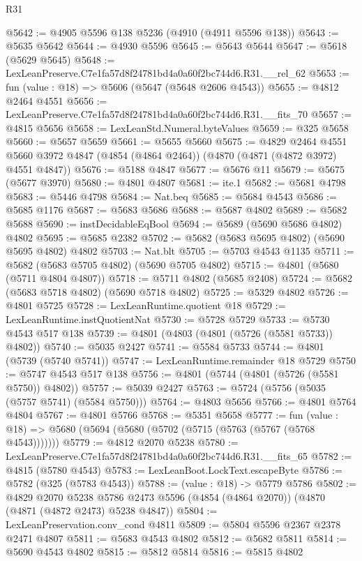 \begin{lexlean}{R31}
\begin{coremodule}
@5642 := @4905 @5596 @138 @5236 (@4910 (@4911 @5596 @138))
@5643 := @5635 @5642
@5644 := @4930 @5596
@5645 := @5643 @5644
@5647 := @5618 (@5629 @5645)
@5648 := LexLeanPreserve.C7e1fa57d8f24781bd4a0a60f2bc744d6.R31.__rel_62
@5653 := fun (value : @18) => @5606 (@5647 (@5648 @2606 @4543))
@5655 := @4812 @2464 @4551
@5656 := LexLeanPreserve.C7e1fa57d8f24781bd4a0a60f2bc744d6.R31.__fits_70
@5657 := @4815 @5656
@5658 := LexLeanStd.Numeral.byteValues
@5659 := @325 @5658
@5660 := @5657 @5659
@5661 := @5655 @5660
@5675 := @4829
    @2464
    @4551
    @5660
    @3972
    @4847
    (@4854 (@4864 @2464))
    (@4870 (@4871 (@4872 @3972) @4551 @4847))
@5676 := @5188 @4847
@5677 := @5676 @11
@5679 := @5675 (@5677 @3970)
@5680 := @4801 @4807
@5681 := ite.{1}
@5682 := @5681 @4798
@5683 := @5446 @4798
@5684 := Nat.beq
@5685 := @5684 @4543
@5686 := @5685 @1176
@5687 := @5683 @5686
@5688 := @5687 @4802
@5689 := @5682 @5688
@5690 := instDecidableEqBool
@5694 := @5689 (@5690 @5686 @4802) @4802
@5695 := @5685 @2382
@5702 := @5682 (@5683 @5695 @4802) (@5690 @5695 @4802) @4802
@5703 := Nat.blt
@5705 := @5703 @4543 @1135
@5711 := @5682 (@5683 @5705 @4802) (@5690 @5705 @4802)
@5715 := @4801 (@5680 (@5711 @4804 @4807))
@5718 := @5711 @4802 (@5685 @2408)
@5724 := @5682 (@5683 @5718 @4802) (@5690 @5718 @4802)
@5725 := @5329 @4802
@5726 := @4801 @5725
@5728 := LexLeanRuntime.quotient @18
@5729 := LexLeanRuntime.instQuotientNat
@5730 := @5728 @5729
@5733 := @5730 @4543 @517 @138
@5739 := @4801 (@4803 (@4801 (@5726 (@5581 @5733)) @4802))
@5740 := @5035 @2427
@5741 := @5584 @5733
@5744 := @4801 (@5739 (@5740 @5741))
@5747 := LexLeanRuntime.remainder @18 @5729
@5750 := @5747 @4543 @517 @138
@5756 := @4801 (@5744 (@4801 (@5726 (@5581 @5750)) @4802))
@5757 := @5039 @2427
@5763 := @5724 (@5756 (@5035 (@5757 @5741) (@5584 @5750)))
@5764 := @4803 @5656
@5766 := @4801 @5764 @4804
@5767 := @4801 @5766
@5768 := @5351 @5658
@5777 := fun (value : @18) => @5680 (@5694 (@5680 (@5702 (@5715 (@5763 (@5767 (@5768 @4543)))))))
@5779 := @4812 @2070 @5238
@5780 := LexLeanPreserve.C7e1fa57d8f24781bd4a0a60f2bc744d6.R31.__fits_65
@5782 := @4815 (@5780 @4543)
@5783 := LexLeanBoot.LockText.escapeByte
@5786 := @5782 (@325 (@5783 @4543))
@5788 := (value : @18) -> @5779 @5786
@5802 := @4829
    @2070
    @5238
    @5786
    @2473
    @5596
    (@4854 (@4864 @2070))
    (@4870 (@4871 (@4872 @2473) @5238 @4847))
@5804 := LexLeanPreservation.conv_cond @4811
@5809 := @5804 @5596 @2367 @2378 @2471 @4807
@5811 := @5683 @4543 @4802
@5812 := @5682 @5811
@5814 := @5690 @4543 @4802
@5815 := @5812 @5814
@5816 := @5815 @4802

\end{coremodule}
\end{lexlean}
